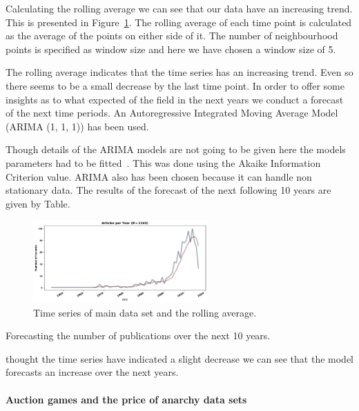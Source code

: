 \documentclass{article}
\theoremstyle{definition}
\begin{document}
Calculating the rolling average we can see that our data have an increasing trend.
This is presented in Figure~\ref{fig:timeseries}. The rolling average of each time
point is calculated as the average of the points on either side of it. The number
of neighbourhood points is specified as window size and here we have chosen a
window size of 5.

The rolling average indicates that the time series has an increasing trend.
Even so there seems to be a small decrease by the last time point. In order
to offer some insights as to what expected of the field in the next years
we conduct a forecast of the next time periods. An Autoregressive Integrated
Moving Average Model (ARIMA (1, 1, 1)) has been used.

Though details of the ARIMA models are not going to be given here the models
parameters had to be fitted~\cite{brockwell2013}. This was done using the Akaike
Information Criterion value. ARIMA also has been chosen because it can handle non
stationary data. The results of the forecast of the next following 10 years are given by Table.

\begin{figure}[!hbtp]
    \centering
    \includegraphics[width=0.6\textwidth]{./assets/images/timeseries.pdf}
    \caption{Time series of main data set and the rolling average.}\label{fig:timeseries}
\end{figure}

\begin{table}[!hbtp]
    \begin{center}
    
    \end{center}
    \caption{Forecasting the number of publications over the next 10 years.}
    \label{table:summary_temporal}
\end{table}

thought the time series have indicated a slight decrease we can see that the
model forecasts an increase over the next years.

\paragraph{Auction games and the price of anarchy data sets}
\mbox{ }\\
\end{document}
